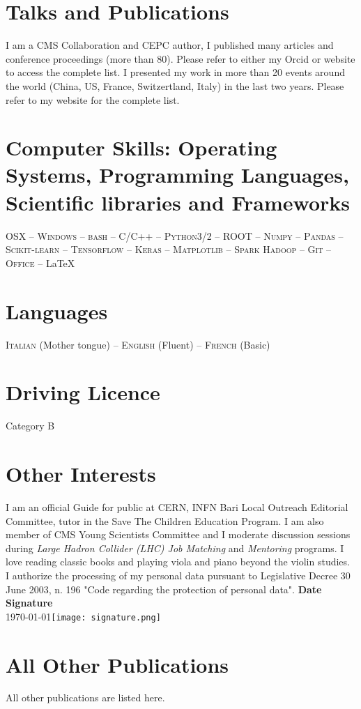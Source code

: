 \documentclass[11pt]{res}
\newif\ifext
\newenvironment{extended}{\ifext}{\fi}
\newcommand{\MarginText}[1]{\section{#1}\vspace{10pt}}
\begin{document}
\begin{resume}
\MarginText{Talks and Publications}\label{publications}

I am a CMS Collaboration and CEPC author, I published many articles and conference proceedings (more than 80). Please refer to either my Orcid or website to access the complete list.
I presented my work in more than 20 events around the world (China, US, France, Switzertland, Italy) in the last two years. Please refer to my website for the complete list.


\MarginText{Computer Skills: Operating Systems, Programming Languages, Scientific libraries and Frameworks}
\textsc{OSX} -- \textsc{Windows} -- \textsc{bash} -- \textsc{C/C++} -- \textsc{Python3/2} -- \textsc{ROOT} -- \textsc{Numpy} -- \textsc{Pandas} -- \textsc{Scikit-learn} -- \textsc{Tensorflow} -- \textsc{Keras} -- \textsc{Matplotlib} -- \textsc{Spark Hadoop} -- \textsc{Git} -- \textsc{Office} -- \LaTeX
\MarginText{Languages}
\textsc{Italian} (Mother tongue) --  \textsc{English} (Fluent) -- \textsc{French} (Basic)
\MarginText{Driving Licence} Category B 
\MarginText{Other Interests} I am an official Guide for public at CERN, INFN Bari Local Outreach Editorial Committee, tutor in the Save The Children Education Program. 
I am also member of CMS Young Scientists Committee and I moderate discussion sessions during \textit{Large Hadron Collider (LHC) Job Matching} and \textit{Mentoring} programs.
I love reading classic books and playing viola and piano beyond the violin studies.\\

I authorize the processing of my personal data pursuant to Legislative Decree 30 June 2003, n. 196 "Code regarding the protection of personal data".
\vspace{25mm}
\center \textbf{Date} \hfill \textbf{Signature}\\
\today \hfill\texttt{[image: signature.png]}\\


\clearpage

\begin{extended}
\nocite{*}
\MarginText{All Other Publications}

All other publications are listed here.

\vspace{10pt}
\printbibliography[heading=none,sorting=nyt]
\end{extended}

\end{resume}
\end{document}
